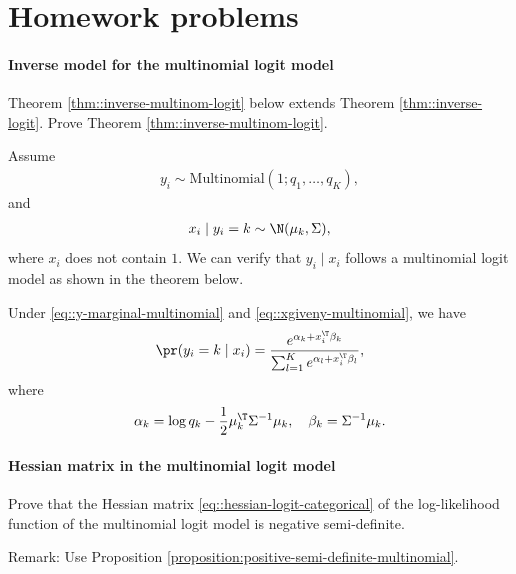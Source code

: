 \section{Homework problems}


\paragraph{Inverse model for the  multinomial logit model}\label{hw18::inverse-multinom}


Theorem \ref{thm::inverse-multinom-logit} below extends Theorem \ref{thm::inverse-logit}. Prove Theorem \ref{thm::inverse-multinom-logit}. 

Assume   
\begin{eqnarray}
y_{i}\sim\text{Multinomial}(1; q_1, \ldots, q_K),
\label{eq::y-marginal-multinomial}
\end{eqnarray}
and
\begin{eqnarray}
x_{i}\mid y_{i}=k\sim\N(\mu_{k},\Sigma),
\label{eq::xgiveny-multinomial}
\end{eqnarray} 
where $x_i$ does not contain $1$.
We can verify that $y_{i}\mid x_{i}$ follows a multinomial logit model as shown in the theorem below.  


\begin{theorem}
\label{thm::inverse-multinom-logit}
Under \eqref{eq::y-marginal-multinomial} and \eqref{eq::xgiveny-multinomial}, we have
$$
 \pr(y_i =k\mid x_i)   =   \frac{  e^{\alpha_k + x_i^{\T} \beta_k} }{   \sum_{l=1}^K e^{\alpha_l + x_i^{\T} \beta_l} } ,
$$
where
\begin{eqnarray*}
\label{eq::alpha-beta-lda}
\alpha_k = \log q_k -\frac{1}{2} \mu_k^{\T}\Sigma^{-1}\mu_k  ,\quad
\beta_k = \Sigma^{-1} \mu_k.
\end{eqnarray*}
\end{theorem}




 

\paragraph{Hessian matrix in the multinomial logit model}\label{hw18::hessian-multinom}

Prove that the Hessian matrix \eqref{eq::hessian-logit-categorical} of the log-likelihood function of the multinomial logit model is negative semi-definite. 


Remark: Use Proposition \ref{proposition:positive-semi-definite-multinomial}. 

